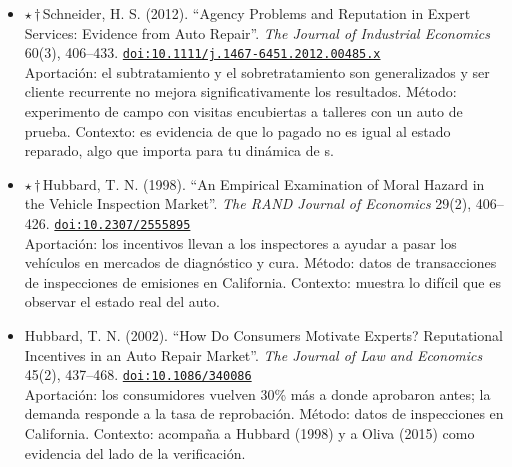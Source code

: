 \documentclass[11pt]{article}
\begin{document}
\begin{itemize}
\item $\star$\,$\dagger$\,Schneider, H. S. (2012). ``Agency Problems and Reputation in Expert Services: Evidence from Auto Repair''. \textit{The Journal of Industrial Economics} 60(3), 406--433. \href{https://doi.org/10.1111/j.1467-6451.2012.00485.x}{\texttt{doi:10.1111/j.1467-6451.2012.00485.x}}\\
Aportación: el subtratamiento y el sobretratamiento son generalizados y ser cliente recurrente no mejora significativamente los resultados. Método: experimento de campo con visitas encubiertas a talleres con un auto de prueba. Contexto: es evidencia de que lo pagado no es igual al estado reparado, algo que importa para tu dinámica de s.
\item $\star$\,$\dagger$\,Hubbard, T. N. (1998). ``An Empirical Examination of Moral Hazard in the Vehicle Inspection Market''. \textit{The RAND Journal of Economics} 29(2), 406--426. \href{https://doi.org/10.2307/2555895}{\texttt{doi:10.2307/2555895}}\\
Aportación: los incentivos llevan a los inspectores a ayudar a pasar los vehículos en mercados de diagnóstico y cura. Método: datos de transacciones de inspecciones de emisiones en California. Contexto: muestra lo difícil que es observar el estado real del auto.
\item Hubbard, T. N. (2002). ``How Do Consumers Motivate Experts? Reputational Incentives in an Auto Repair Market''. \textit{The Journal of Law and Economics} 45(2), 437--468. \href{https://doi.org/10.1086/340086}{\texttt{doi:10.1086/340086}}\\
Aportación: los consumidores vuelven 30\% más a donde aprobaron antes; la demanda responde a la tasa de reprobación. Método: datos de inspecciones en California. Contexto: acompaña a Hubbard (1998) y a Oliva (2015) como evidencia del lado de la verificación.
\end{itemize}
\end{document}
